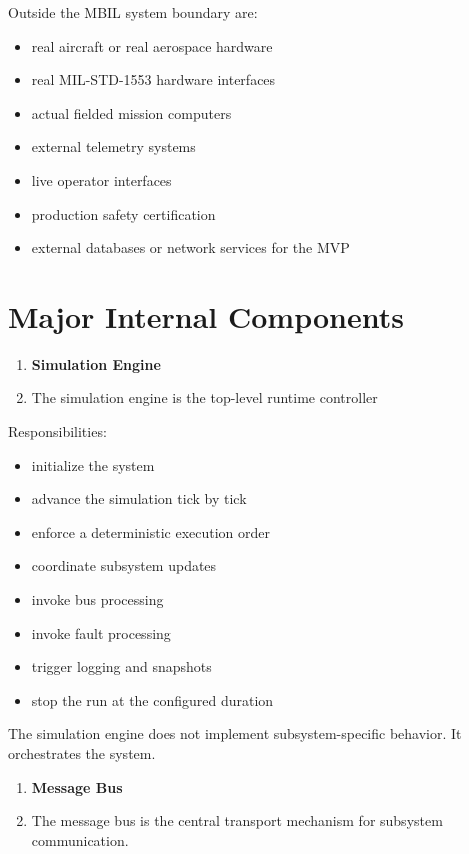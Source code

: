 \documentclass[12pt]{article}
\begin{document}
Outside the MBIL system boundary are:

\begin{itemize}[leftmargin=*]
    \item real aircraft or real aerospace hardware
    \item real MIL-STD-1553 hardware interfaces
    \item actual fielded mission computers
    \item external telemetry systems
    \item live operator interfaces
    \item production safety certification
    \item external databases or network services for the MVP
\end{itemize}

\section{Major Internal Components}
\begin{enumerate}
    \item \textbf{Simulation Engine}
    \item[] The simulation engine is the top-level runtime controller
\end{enumerate}

Responsibilities:
\begin{itemize}[leftmargin=*]
    \item initialize the system
    \item advance the simulation tick by tick
    \item enforce a deterministic execution order
    \item coordinate subsystem updates
    \item invoke bus processing
    \item invoke fault processing
    \item trigger logging and snapshots
    \item stop the run at the configured duration
\end{itemize}

The simulation engine does not implement subsystem-specific behavior.  It orchestrates the system.

\begin{enumerate}[start=2]
    \item \textbf{Message Bus}
    \item[] The message bus is the central transport mechanism for subsystem communication.
\end{enumerate}
\end{document}
